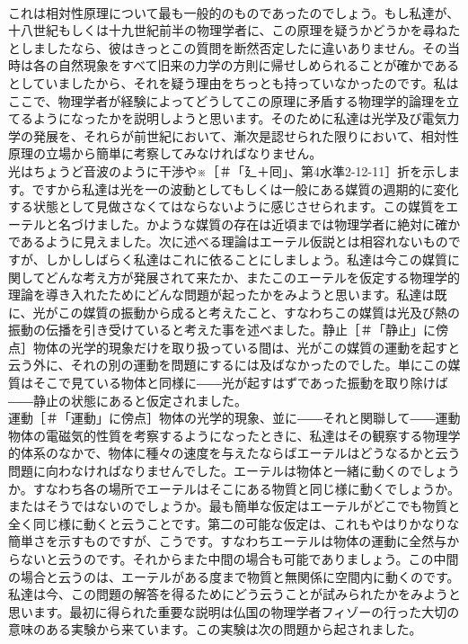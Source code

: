 \documentclass[8pt]{extreport}
\begin{document}
\begin{CJK}{UTF8}{min}
\\	これは相対性原理について最も一般的のものであったのでしょう。もし私達が、十八世紀もしくは十九世紀前半の物理学者に、この原理を疑うかどうかを尋ねたとしましたなら、彼はきっとこの質問を断然否定したに違いありません。その当時は各の自然現象をすべて旧来の力学の方則に帰せしめられることが確かであるとしていましたから、それを疑う理由をちっとも持っていなかったのです。私はここで、物理学者が経験によってどうしてこの原理に矛盾する物理学的論理を立てるようになったかを説明しようと思います。そのために私達は光学及び電気力学の発展を、それらが前世紀において、漸次是認せられた限りにおいて、相対性原理の立場から簡単に考察してみなければなりません。
\\	光はちょうど音波のように干渉や※［＃「廴＋囘」、第4水準2-12-11］折を示します。ですから私達は光を一の波動としてもしくは一般にある媒質の週期的に変化する状態として見做さなくてはならないように感じさせられます。この媒質をエーテルと名づけました。かような媒質の存在は近頃までは物理学者に絶対に確かであるように見えました。次に述べる理論はエーテル仮説とは相容れないものですが、しかししばらく私達はこれに依ることにしましょう。私達は今この媒質に関してどんな考え方が発展されて来たか、またこのエーテルを仮定する物理学的理論を導き入れたためにどんな問題が起ったかをみようと思います。私達は既に、光がこの媒質の振動から成ると考えたこと、すなわちこの媒質は光及び熱の振動の伝播を引き受けていると考えた事を述べました。静止［＃「静止」に傍点］物体の光学的現象だけを取り扱っている間は、光がこの媒質の運動を起すと云う外に、それの別の運動を問題にするには及ばなかったのでした。単にこの媒質はそこで見ている物体と同様に――光が起すはずであった振動を取り除けば――静止の状態にあると仮定されました。
\\	運動［＃「運動」に傍点］物体の光学的現象、並に――それと関聯して――運動物体の電磁気的性質を考察するようになったときに、私達はその観察する物理学的体系のなかで、物体に種々の速度を与えたならばエーテルはどうなるかと云う問題に向わなければなりませんでした。エーテルは物体と一緒に動くのでしょうか。すなわち各の場所でエーテルはそこにある物質と同じ様に動くでしょうか。またはそうではないのでしょうか。最も簡単な仮定はエーテルがどこでも物質と全く同じ様に動くと云うことです。第二の可能な仮定は、これもやはりかなりな簡単さを示すものですが、こうです。すなわちエーテルは物体の運動に全然与からないと云うのです。それからまた中間の場合も可能でありましょう。この中間の場合と云うのは、エーテルがある度まで物質と無関係に空間内に動くのです。私達は今、この問題の解答を得るためにどう云うことが試みられたかをみようと思います。最初に得られた重要な説明は仏国の物理学者フィゾーの行った大切の意味のある実験から来ています。この実験は次の問題から起されました。

\end{CJK}
\end{document}
